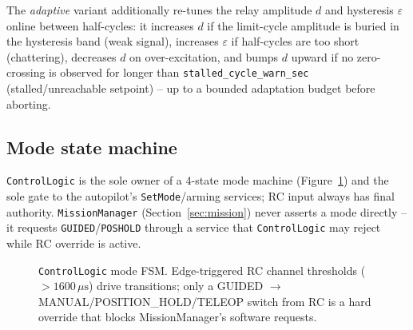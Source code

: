 The \emph{adaptive} variant additionally re-tunes the relay amplitude $d$ and hysteresis $\varepsilon$ online between half-cycles: it increases $d$ if the limit-cycle amplitude is buried in the hysteresis band (weak signal), increases $\varepsilon$ if half-cycles are too short (chattering), decreases $d$ on over-excitation, and bumps $d$ upward if no zero-crossing is observed for longer than \texttt{stalled\_cycle\_warn\_sec} (stalled/unreachable setpoint) -- up to a bounded adaptation budget before aborting.


\subsection{Mode state machine}

\texttt{ControlLogic} is the sole owner of a 4-state mode machine (Figure~\ref{fig:fsm}) and the sole gate to the autopilot's \texttt{SetMode}/arming services; RC input always has final authority. \texttt{MissionManager} (Section~\ref{sec:mission}) never asserts a mode directly -- it requests \texttt{GUIDED}/\texttt{POSHOLD} through a service that \texttt{ControlLogic} may reject while RC override is active.

\begin{figure}[H]
\centering
{}
\caption{\texttt{ControlLogic} mode FSM. Edge-triggered RC channel thresholds ($>1600\,\mu\text{s}$) drive transitions; only a GUIDED $\to$ MANUAL/POSITION\_HOLD/TELEOP switch from RC is a hard override that blocks MissionManager's software requests.}
\label{fig:fsm}
\end{figure}
